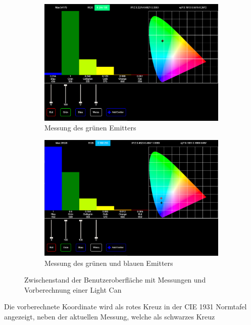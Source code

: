 \documentclass[11pt]{scrartcl}
\begin{document}
\begin{figure}[H]
    \centering
    \begin{subfigure}[b]{.49\textwidth}
        \includegraphics[width=\textwidth]{images/app_dummy_spectrum_with_xy_and_calc_and_emitters.png}
        \caption{Messung des grünen Emitters}
    \end{subfigure}
    \hfill 
    \begin{subfigure}[b]{.49\textwidth}
        \includegraphics[width=\textwidth]{images/app_dummy_spectrum_with_xy_and_calc_and_emitters_green_blue.png}
        \caption{Messung des grünen und blauen Emitters}\label{fig:calcLightCanMix}
    \end{subfigure}
    \caption{Zwischenstand der Benutzeroberfläche mit Messungen und Vorberechnung einer Light Can}
\end{figure}
\noindent
Die vorberechnete Koordinate wird als rotes Kreuz in der CIE 1931 Normtafel angezeigt, neben der aktuellen Messung, welche als schwarzes Kreuz
\end{document}
